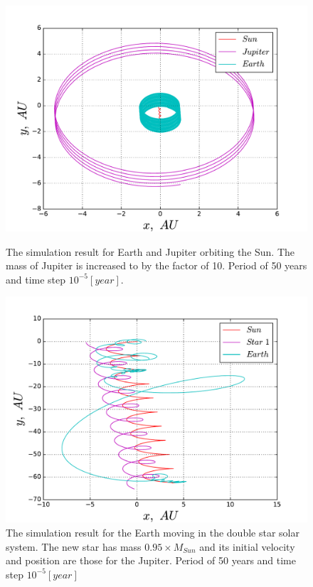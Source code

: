 \documentclass[10pt]{article}
\begin{document}
\newpage
\begin{figure}[ht]
  \begin{center}
    \includegraphics[scale=0.5]{3body_10x_jup}
    \caption {The simulation result for Earth and Jupiter orbiting the Sun. The mass of Jupiter is increased to by the factor of 10. Period of 50 years and time step $10^{-5} [year]$.}
    \label{fig:3body_10x_jup}
  \end{center}
\vspace*{\floatsep}
  \begin{center}
    \includegraphics[scale=0.5]{3body}
    \caption {The simulation result for the Earth moving in the double star solar system. The new star has mass $0.95\times M_{Sun}$ and its initial velocity and position are those for the Jupiter. Period of 50 years and time step $10^{-5} [year]$}
    \label{fig:3body}
  \end{center}
\end{figure}
\clearpage
  
\end{document}
